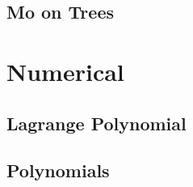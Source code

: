 \subsection{Mo on Trees}
\vspace{-2.3ex}
\raggedbottom
\vspace{-3.3ex}
\hrulefill

\section{Numerical}
\vspace{-1ex}
\subsection{Lagrange Polynomial}
\vspace{-2.3ex}
\raggedbottom
\vspace{-3.3ex}
\hrulefill
\vspace{-1ex}
\subsection{Polynomials}
\vspace{-2.3ex}
\raggedbottom
\vspace{-3.3ex}
\hrulefill

